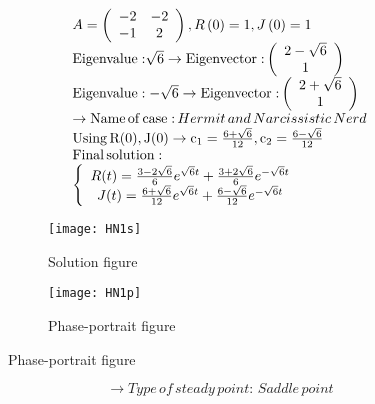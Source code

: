 \documentclass[a4paper]{article}
\begin{document}
\[\begin{array}{l}
A = \left( {\begin{array}{*{20}{c}}
{ - 2}&{ - 2}\\
{ - 1}&2
\end{array}} \right),R\left( 0 \right) = 1,J\left( 0 \right) = 1\\
{\rm{Eigenvalue:}}\sqrt 6  \to {\rm{Eigenvector:}}\left( {\begin{array}{*{20}{c}}
{2 - \sqrt 6 }\\
1
\end{array}} \right)\\
{\rm{Eigenvalue: - }}\sqrt 6  \to {\rm{Eigenvector:}}\left( {\begin{array}{*{20}{c}}
{2 + \sqrt 6 }\\
1
\end{array}} \right)\\
 \to {\rm{Name}}\,{\rm{of}}\,{\rm{case:}}\,Hermit\,and\,Narcissistic\,Nerd\\
{\rm{Using}}\,{\rm{R}}({\rm{0}}),{\rm{J}}({\rm{0}}) \to {{\rm{c}}_1} = \frac{{6 + \sqrt 6 }}{{12}},{{\rm{c}}_2} = \frac{{6 - \sqrt 6 }}{{12}}\\
{\rm{Final}}\,{\rm{solution:}}\\
\left\{ {\begin{array}{*{20}{c}}
{R(t) = \frac{{3 - 2\sqrt 6 }}{6}{e^{\sqrt 6 t}} + \frac{{3 + 2\sqrt 6 }}{6}{e^{ - \sqrt 6 t}}}\\
{J(t) = \frac{{6 + \sqrt 6 }}{{12}}{e^{\sqrt 6 t}} + \frac{{6 - \sqrt 6 }}{{12}}{e^{ - \sqrt 6 t}}}
\end{array}} \right.
\end{array}\]
\begin{figure}[H]
\centering
\begin{subfigure}{.5\textwidth}
  \centering
  \texttt{[image: HN1s]}
  \caption*{Solution figure}
\end{subfigure}%
\begin{subfigure}{.5\textwidth}
  \centering
  \texttt{[image: HN1p]}
  \caption*{Phase-portrait figure}
\end{subfigure}
\end{figure}
\[  \to  Type\,of\,steady\,point:\,Saddle\,point\]
\end{document}
